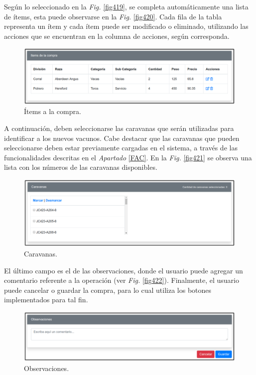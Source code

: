 \documentclass[11pt,oneside]{book}
\begin{document}
\newpage
Según lo seleccionado en la \textit{Fig.} \eqref{fig419}, se completa automáticamente una lista de ítems, esta puede observarse en la \textit{Fig.} \eqref{fig420}. Cada fila de la tabla representa un ítem y cada ítem puede ser modificado o eliminado, utilizando las acciones que se encuentran en la columna de acciones, según corresponda.
\begin{figure}[tbhp]
\centerline{\includegraphics[scale=0.87]{figs/capitulo_3_desarrollo/fig420.pdf}}
\caption{Ítems a la compra.}
\label{fig420}
\end{figure}

A continuación, deben seleccionarse las caravanas que serán utilizadas para identificar a los nuevos vacunos. Cabe destacar que las caravanas que pueden seleccionarse deben estar previamente cargadas en el sistema, a través de las funcionalidades descritas en el \textit{Apartado} \eqref{FAC}. En la \textit{Fig.} \eqref{fig421} se observa una lista con los números de las caravanas disponibles.

\begin{figure}[tbhp]
\centerline{\includegraphics[scale=0.87]{figs/capitulo_3_desarrollo/fig421.pdf}}
\caption{Caravanas.}
\label{fig421}
\end{figure}

\newpage
El último campo es el de las observaciones, donde el usuario puede agregar un comentario referente a la operación (ver \textit{Fig.} \eqref{fig422}). Finalmente, el usuario puede cancelar o guardar la compra, para lo cual utiliza los botones implementados para tal fin. 
\begin{figure}[tbhp]
\centerline{\includegraphics[scale=0.87]{figs/capitulo_3_desarrollo/fig422.pdf}}
\caption{Observaciones.}
\label{fig422}
\end{figure}
\end{document}
